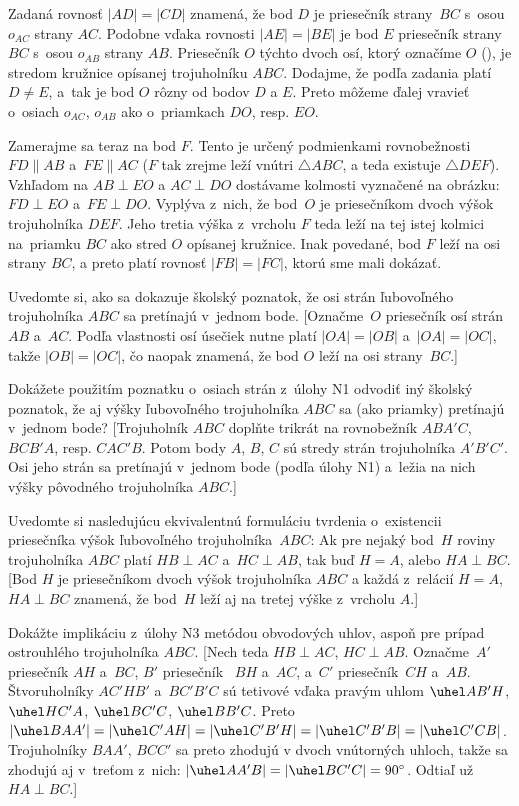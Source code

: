 {%
Zadaná rovnosť $|AD|=|CD|$ znamená, že bod $D$ je priesečník
strany~$BC$ s~osou $o_{AC}$ strany $AC$. Podobne vďaka
rovnosti $|AE|=|BE|$ je bod $E$ priesečník strany~$BC$
s~osou $o_{AB}$ strany $AB$. Priesečník $O$ týchto dvoch osí, ktorý
označíme $O$ (\obr), je stredom kružnice opísanej trojuholníku
$ABC$. Dodajme, že podľa zadania platí $D\ne E$, a~tak je bod
$O$ rôzny od bodov $D$ a $E$. Preto môžeme ďalej vravieť o~osiach
$o_{AC}$, $o_{AB}$ ako o~priamkach $DO$, resp. $EO$.
%

Zamerajme sa teraz na bod $F$. Tento je určený podmienkami
rovnobežnosti $FD \parallel AB$ a~$FE \parallel AC$
($F$ tak zrejme leží vnútri $\triangle ABC$, a teda
existuje $\triangle DEF$). Vzhľadom na $AB\perp EO$ a $AC\perp DO$
dostávame kolmosti vyznačené na obrázku: $FD\perp EO$ a~$FE\perp DO$.
Vyplýva z~nich, že bod~$O$ je priesečníkom dvoch výšok trojuholníka $DEF$.
Jeho tretia výška z~vrcholu $F$ teda leží na tej istej kolmici
na~priamku $BC$ ako stred $O$ opísanej kružnice. Inak povedané,
bod $F$ leží na osi strany $BC$, a preto platí rovnosť $|FB|=|FC|$,
ktorú sme mali dokázať.

Uvedomte si, ako sa dokazuje školský poznatok,
že osi strán ľubovoľného trojuholníka $ABC$ sa pretínajú
v~jednom bode.
[Označme~$O$ priesečník osí strán $AB$ a~$AC$.
Podľa vlastnosti osí úsečiek nutne platí
$|OA|=|OB|$ a~$|OA|=|OC|$, takže $|OB|=|OC|$, čo naopak znamená,
že bod $O$ leží na osi strany~$BC$.]

Dokážete použitím poznatku o~osiach strán z~úlohy N1 odvodiť
iný školský poznatok, že aj výšky ľubovoľného trojuholníka $ABC$
sa (ako priamky) pretínajú v~jednom bode?
[Trojuholník $ABC$ doplňte trikrát na rovnobežník $ABA'C$,
$BCB'A$, resp. $CAC'B$. Potom body $A$, $B$, $C$ sú
stredy strán trojuholníka $A'B'C'$. Osi jeho strán
sa pretínajú v~jednom bode (podľa úlohy N1)
a~ležia na nich výšky pôvodného trojuholníka $ABC$.]

Uvedomte si nasledujúcu ekvivalentnú formuláciu tvrdenia
o~existencii priesečníka výšok ľubovoľného trojuholníka~$ABC$:
Ak pre nejaký bod~$H$ roviny trojuholníka $ABC$ platí
$HB\perp AC$ a~$HC\perp AB$, tak buď $H=A$, alebo $HA\perp BC$.
[Bod $H$ je priesečníkom dvoch výšok trojuholníka $ABC$ a každá
z~relácií $H=A$, $HA\perp BC$ znamená, že bod~$H$ leží aj
na tretej výške z~vrcholu $A$.]

\D
Dokážte implikáciu z~úlohy N3 metódou obvodových uhlov,
aspoň pre prípad ostrouhlého trojuholníka $ABC$.
[Nech teda $HB\perp AC$, $HC\perp AB$.
Označme~$A'$ priesečník $AH$ a~$BC$, $B'$ priesečník~
$BH$ a~$AC$, a~$C'$ priesečník~$CH$ a~$AB$.
Štvoruholníky $AC'HB'$ a~$BC'B'C$ sú tetivové vďaka
pravým uhlom $\uhel AB'H$, $\uhel HC'A$, $\uhel BC'C$, $\uhel BB'C$.
Preto $|\uhel BAA'|=|\uhel C'AH|=|\uhel C'B'H|=|\uhel
C'B'B|=|\uhel C'CB|$. Trojuholníky $BAA'$, $BCC'$ sa preto
zhodujú v dvoch vnútorných uhloch, takže sa zhodujú aj v~treťom
z~nich: $|\uhel AA'B|=|\uhel BC'C|=90^\circ$. Odtiaľ už $HA\perp
BC$.]

}
